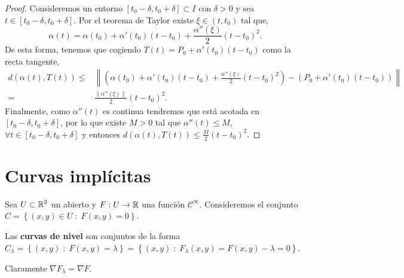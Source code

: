 \begin{proof}
	Consideremos un entorno $\displaystyle \left[t_{0}-\delta , t_{0} + \delta \right] \subset I $ con $\displaystyle \delta > 0 $ y sea $\displaystyle t \in \left[t_{0}-\delta, t_{0} + \delta \right]  $. Por el teorema de Taylor existe $\displaystyle \xi \in \left(t, t_{0}\right) $ tal que,
\[\alpha\left(t\right)=\alpha\left(t_{0}\right)+\alpha'\left(t_{0}\right)\left(t-t_{0}\right)+ \frac{\alpha''\left(\xi\right)}{2}\left(t-t_{0}\right)^{2} .\]
De esta forma, tenemos que cogiendo $\displaystyle T\left(t\right)=P_{0} + \alpha'\left(t_{0}\right)\left(t-t_{0}\right) $ como la recta tangente, 
\[
\begin{split}
	d\left(\alpha\left(t\right), T\left(t\right)\right) \leq & \left\|\left(\alpha\left(t_{0}\right)+\alpha'\left(t_{0}\right)\left(t-t_{0}\right)+\frac{\alpha''\left(\xi\right)}{2}\left(t-t_{0}\right)^{2}\right)-\left(P_{0}+\alpha'\left(t_{0}\right)\left(t-t_{0}\right)\right)\right\|\\
	= & \frac{\|\alpha''\left(\xi\right)\|}{2}\left(t-t_{0}\right)^{2} .
\end{split}
\]
Finalmente, como $\displaystyle \alpha''\left(t\right) $ es continua tendremos que está acotada en $\displaystyle \left[t_{0}-\delta, t_{0} + \delta \right]  $, por lo que existe $\displaystyle M > 0 $ tal que $\displaystyle \alpha''\left(t\right)\leq M $, $\displaystyle \forall t \in \left[t_{0}-\delta, t_{0} + \delta \right]  $ y entonces $\displaystyle d\left(\alpha\left(t\right), T\left(t\right)\right)\leq \frac{M}{2}\left(t-t_{0}\right)^{2} $.  
\end{proof}

\section{Curvas implícitas}
Sea $\displaystyle U\subset\mathbb{R}^{2} $ un abierto y $\displaystyle F : U \to \mathbb{R} $ una función $\displaystyle \mathcal{C}^{\infty} $. Consideremos el conjunto $\displaystyle C = \left\{ \left(x,y\right)\in U \; : \; F\left(x,y\right)= 0\right\}  $. 
\begin{definition}
Las \textbf{curvas de nivel} son conjuntos de la forma $\displaystyle C_{\lambda } = \left\{ \left(x,y\right) \; : \; F\left(x,y\right)=\lambda \right\} = \left\{ \left(x,y\right) \; : \; F_{\lambda }\left(x,y\right)=F\left(x,y\right)-\lambda = 0\right\}  $. 
\end{definition}
\begin{observation}
Claramente $\displaystyle \nabla F_{\lambda }=\nabla F $.
\end{observation}

